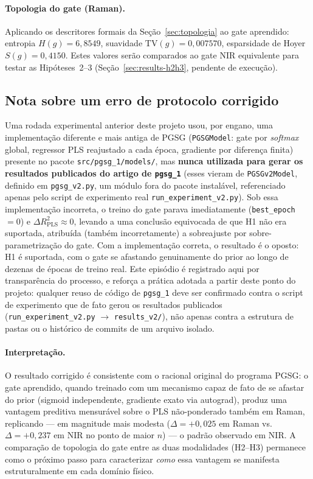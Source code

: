 \paragraph{Topologia do gate (Raman).} Aplicando os descritores formais da Seção~\ref{sec:topologia} ao gate aprendido: entropia $H(g)=6{,}8549$, suavidade $\mathrm{TV}(g)=0{,}007570$, esparsidade de Hoyer $S(g)=0{,}4150$. Estes valores serão comparados ao gate NIR equivalente para testar as Hipóteses~2--3 (Seção~\ref{sec:results-h2h3}, pendente de execução).

\subsection{Nota sobre um erro de protocolo corrigido}
\label{sec:erratum}

Uma rodada experimental anterior deste projeto usou, por engano, uma implementação diferente e mais antiga de PGSG (\texttt{PGSGModel}: gate por \emph{softmax} global, regressor PLS reajustado a cada época, gradiente por diferença finita) presente no pacote \texttt{src/pgsg\_1/models/}, mas \textbf{nunca utilizada para gerar os resultados publicados do artigo de \texttt{pgsg\_1}} (esses vieram de \texttt{PGSGv2Model}, definido em \texttt{pgsg\_v2.py}, um módulo fora do pacote instalável, referenciado apenas pelo script de experimento real \texttt{run\_experiment\_v2.py}). Sob essa implementação incorreta, o treino do gate parava imediatamente (\texttt{best\_epoch}~$=0$) e $\Delta R^2_{\text{PLS}} \approx 0$, levando a uma conclusão equivocada de que H1 não era suportada, atribuída (também incorretamente) a sobreajuste por sobre-parametrização do gate. Com a implementação correta, o resultado é o oposto: H1 é suportada, com o gate se afastando genuinamente do prior ao longo de dezenas de épocas de treino real. Este episódio é registrado aqui por transparência do processo, e reforça a prática adotada a partir deste ponto do projeto: qualquer reuso de código de \texttt{pgsg\_1} deve ser confirmado contra o script de experimento que de fato gerou os resultados publicados (\texttt{run\_experiment\_v2.py} $\to$ \texttt{results\_v2/}), não apenas contra a estrutura de pastas ou o histórico de commits de um arquivo isolado.

\paragraph{Interpretação.} O resultado corrigido é consistente com o racional original do programa PGSG: o gate aprendido, quando treinado com um mecanismo capaz de fato de se afastar do prior (sigmoid independente, gradiente exato via autograd), produz uma vantagem preditiva mensurável sobre o PLS não-ponderado também em Raman, replicando --- em magnitude mais modesta ($\Delta=+0{,}025$ em Raman vs.\ $\Delta=+0{,}237$ em NIR no ponto de maior $n$) --- o padrão observado em NIR. A comparação de topologia do gate entre as duas modalidades (H2--H3) permanece como o próximo passo para caracterizar \emph{como} essa vantagem se manifesta estruturalmente em cada domínio físico.
